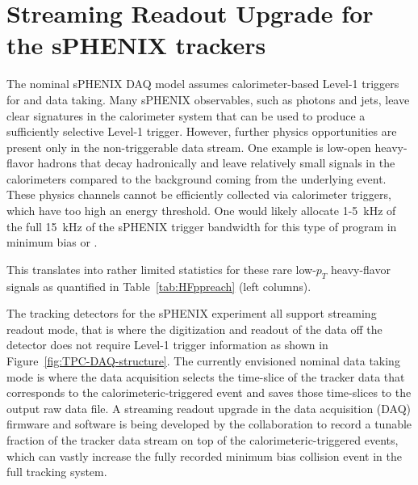 
\section{Streaming Readout Upgrade for the sPHENIX trackers}

The nominal sPHENIX DAQ model assumes calorimeter-based Level-1
triggers for \pp and \pau data taking.  Many sPHENIX observables, such
as photons and jets, leave clear signatures in the calorimeter system
that can be used to produce a sufficiently selective Level-1 trigger.
However, further physics opportunities are present only in the
non-triggerable data stream.  One example is low-\pt open heavy-flavor
hadrons that decay hadronically and leave relatively small signals in
the calorimeters compared to the background coming from the underlying
event.  These physics channels cannot be efficiently collected via
calorimeter triggers, which have too high an energy threshold.
One would likely allocate 1-5~kHz of the full 15~kHz of the sPHENIX
trigger bandwidth for this type of program in minimum bias \pp or
\pau.

This translates into rather limited statistics for these rare
low-$p_T$ heavy-flavor signals as quantified in
Table~\ref{tab:HFppreach} (left columns).

The tracking detectors for the sPHENIX experiment all support streaming readout mode, that is where the digitization and readout of the data off the detector does not require Level-1 trigger information as shown in Figure~\ref{fig:TPC-DAQ-structure}. The currently envisioned nominal data taking mode is where the data acquisition selects the time-slice of the tracker data that  corresponds to the calorimeteric-triggered event and saves those time-slices to the output raw data file. 
A streaming readout upgrade in the data acquisition (DAQ) firmware and software is being developed by the collaboration to record a tunable fraction of the tracker data stream on top of the calorimeteric-triggered events, which can vastly increase the fully recorded minimum bias collision event in the full tracking system. 

